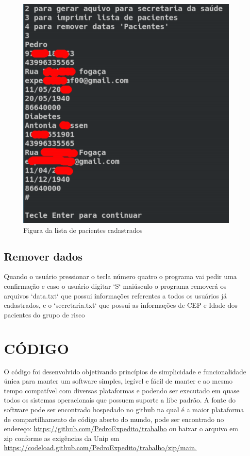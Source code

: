 \documentclass[
	12pt,				%
	oneside,			%
	a4paper,			%
  section=TITLE,
	brazil,				%
	]{abntex2}
\begin{document}
\begin{figure}[htb]
\caption{\label{fig_user_print_list}Figura da lista de pacientes cadastrados}
\begin{center}
  \includegraphics[scale=3.00]{img/user-print-list.png}
\end{center}
\end{figure}

\subsection{Remover dados}

Quando o usuário pressionar o tecla número quatro o programa vai pedir uma
confirmação e caso o usuário digitar `S` maiúsculo o programa removerá os
arquivos `data.txt` que possui informações referentes a todos os usuários já
cadastrados, e o `secretaria.txt` que possui as informações de CEP e Idade dos
pacientes do grupo de risco

\section{CÓDIGO}

O código foi desenvolvido objetivando princípios de simplicidade e
funcionalidade única para manter um software simples, legível e fácil de manter
e ao mesmo tempo compatível com diversas plataformas e podendo ser executado em
quase todos os sistemas operacionais que possuem suporte a libc padrão. A fonte
do software pode ser encontrado hospedado no github na qual é a maior
plataforma de compartilhamento de código aberto do mundo, pode ser encontrado
no endereço: \url{https://github.com/PedroExpedito/trabalho} ou baixar o arquivo em
zip conforme as exigências da Unip em
\url{https://codeload.github.com/PedroExpedito/trabalho/zip/main.}
\end{document}
